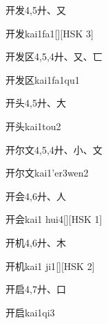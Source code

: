 \begin{entry}{开发}{4,5}{⼶、⼜}
  \begin{phonetics}{开发}{kai1fa1}[][HSK 3]
  \end{phonetics}
\end{entry}

\begin{entry}{开发区}{4,5,4}{⼶、⼜、⼖}
  \begin{phonetics}{开发区}{kai1fa1qu1}
  \end{phonetics}
\end{entry}

\begin{entry}{开头}{4,5}{⼶、⼤}
  \begin{phonetics}{开头}{kai1tou2}
  \end{phonetics}
\end{entry}

\begin{entry}{开尔文}{4,5,4}{⼶、⼩、⽂}
  \begin{phonetics}{开尔文}{kai1'er3wen2}
  \end{phonetics}
\end{entry}

\begin{entry}{开会}{4,6}{⼶、⼈}
  \begin{phonetics}{开会}{kai1 hui4}[][HSK 1]
  \end{phonetics}
\end{entry}

\begin{entry}{开机}{4,6}{⼶、⽊}
  \begin{phonetics}{开机}{kai1 ji1}[][HSK 2]
  \end{phonetics}
\end{entry}

\begin{entry}{开启}{4,7}{⼶、⼝}
  \begin{phonetics}{开启}{kai1qi3}
  \end{phonetics}
\end{entry}

